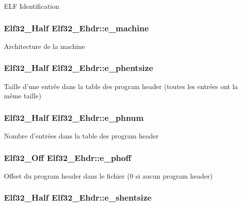 E\-L\-F Identification \hypertarget{structElf32__Ehdr_a19bca7faba9e5573814643efc3574c7b}{
\subsubsection[{e\-\_\-machine}]{\setlength{\rightskip}{0pt plus 5cm}Elf32\-\_\-\-Half Elf32\-\_\-\-Ehdr\-::e\-\_\-machine}}\label{structElf32__Ehdr_a19bca7faba9e5573814643efc3574c7b}
Architecture de la machine \hypertarget{structElf32__Ehdr_afa2289f96d86fcc568a3b1f40cc8953e}{
\subsubsection[{e\-\_\-phentsize}]{\setlength{\rightskip}{0pt plus 5cm}Elf32\-\_\-\-Half Elf32\-\_\-\-Ehdr\-::e\-\_\-phentsize}}\label{structElf32__Ehdr_afa2289f96d86fcc568a3b1f40cc8953e}
Taille d'une entrée dans la table des program header (toutes les entrées ont la même taille) \hypertarget{structElf32__Ehdr_a360898812db1655f8cb8258780d9df5b}{
\subsubsection[{e\-\_\-phnum}]{\setlength{\rightskip}{0pt plus 5cm}Elf32\-\_\-\-Half Elf32\-\_\-\-Ehdr\-::e\-\_\-phnum}}\label{structElf32__Ehdr_a360898812db1655f8cb8258780d9df5b}
Nombre d'entrées dans la table des program header \hypertarget{structElf32__Ehdr_a25c36fc010284a928604aae005b67ad1}{
\subsubsection[{e\-\_\-phoff}]{\setlength{\rightskip}{0pt plus 5cm}Elf32\-\_\-\-Off Elf32\-\_\-\-Ehdr\-::e\-\_\-phoff}}\label{structElf32__Ehdr_a25c36fc010284a928604aae005b67ad1}
Offset du program header dans le fichier (0 si aucun program header) \hypertarget{structElf32__Ehdr_ab53c709a841960e499da68e2316ed428}{
\subsubsection[{e\-\_\-shentsize}]{\setlength{\rightskip}{0pt plus 5cm}Elf32\-\_\-\-Half Elf32\-\_\-\-Ehdr\-::e\-\_\-shentsize}}\label{structElf32__Ehdr_ab53c709a841960e499da68e2316ed428}
